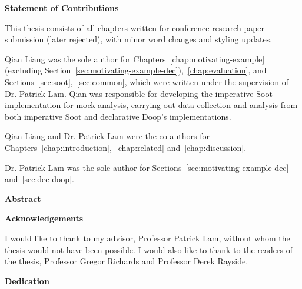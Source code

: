 \cleardoublepage

\begin{center}\textbf{Statement of Contributions}\end{center}

This thesis consists of all chapters written for conference research paper submission (later rejected), with minor word changes and styling updates.

Qian Liang was the sole author for Chapters~\ref{chap:motivating-example} (excluding Section~\ref{sec:motivating-example-dec}),~\ref{chap:evaluation}, and Sections~\ref{sec:soot},~\ref{sec:common}, which were written under the supervision of Dr. Patrick Lam. Qian was responsible for developing the imperative Soot implementation for mock analysis, carrying out data collection and analysis from both imperative Soot and declarative Doop's implementations.

Qian Liang and Dr. Patrick Lam were the co-authors for Chapters~\ref{chap:introduction},~\ref{chap:related} and~\ref{chap:discussion}. 

Dr. Patrick Lam was the sole author for Sections~\ref{sec:motivating-example-dec} and~\ref{sec:dec-doop}.

\cleardoublepage


\begin{center}\textbf{Abstract}\end{center}




\cleardoublepage


\begin{center}\textbf{Acknowledgements}\end{center}

I would like to thank to my advisor, Professor Patrick Lam, without whom the thesis
would not have been possible. I would also like to thank to the readers of the thesis,
Professor Gregor Richards and Professor Derek Rayside.
\cleardoublepage


\begin{center}\textbf{Dedication}\end{center}

